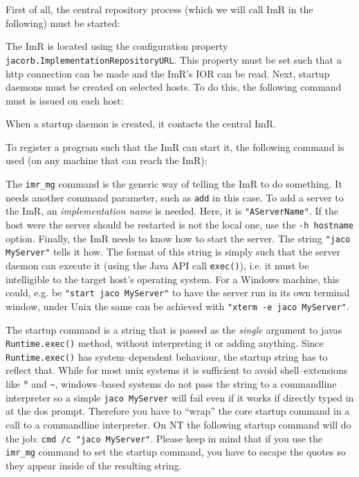 \documentclass[12pt]{scrbook}
\begin{document}
First of all, the central repository process (which we will call ImR
in the following) must be started:


The   ImR   is  located   using   the   configuration  property   {\tt
jacorb.ImplementationRepositoryURL}.  This property  must be  set such
that  a  http  connection  can  be  made and  the  ImR's  IOR  can  be
read. Next, startup  daemons must be created on  selected hosts. To do
this, the following command must is issued on each host:


When a startup  daemon is created, it contacts  the central ImR.

To register  a program such that  the ImR can start  it, the following
command is used (on any machine that can reach the ImR):


The {\tt imr\_mg} command is the  generic way of telling the ImR to do
something. It  needs another command  parameter, such as {\tt  add} in
this case. To add a server to the ImR, an {\em implementation name} is
needed. Here, it is {\tt  "AServerName"}.  If the host were the server
should be  restarted is not the  local one, use the  {\tt -h hostname}
option.  Finally, the  ImR needs to know how to  start the server. The
string {\tt "jaco  MyServer"} tells it how. The  format of this string
is simply such  that the server daemon can execute  it (using the Java
API call  {\tt exec()}), i.e.  it  must be intelligible  to the target
host's operating system.   For a Windows machine, this  could, e.g. be
{\tt "start jaco MyServer"} to have the server run in its own terminal
window, under Unix  the same can be achieved with  {\tt "xterm -e jaco
MyServer"}.

The startup  command is a  string that is  passed as the  {\em single}
argument to javas {\tt Runtime.exec()} method, without interpreting it
or adding  anything. Since {\tt  Runtime.exec()} has system--dependent
behaviour, the startup string has to reflect that. While for most unix
systems it is  sufficient to avoid shell--extensions like  * and
\verb+~+,
windows--based  systems  do  not  pass  the string  to  a  commandline
interpreter so a simple {\tt jaco MyServer} will fail even if it works
if directly typed in at the dos prompt. Therefore you have to ``wrap''
the core startup command in a call to a commandline interpreter. On NT
the  following startup  command will  do the  job: {\tt  cmd  /c "jaco
MyServer"}.  Please  keep in  mind that if  you use the  {\tt imr\_mg}
command to set  the startup command, you have to  escape the quotes so
they appear inside of the resulting string.
\end{document}
